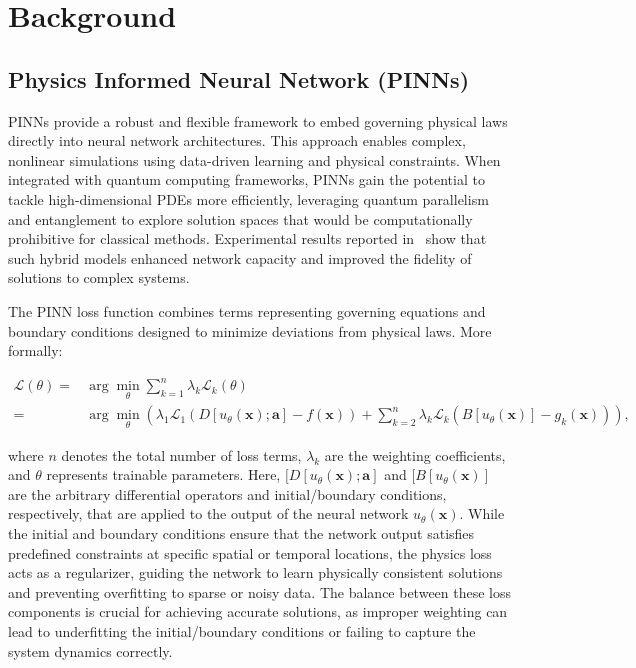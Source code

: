 \section{Background}
\label{sec:background}
\subsection{Physics Informed Neural Network (PINNs)}

PINNs \cite{raissi2019physics} provide a robust and flexible framework to embed governing physical laws directly into neural network architectures. This approach enables complex, nonlinear simulations using data-driven learning and physical constraints. When integrated with quantum computing frameworks, PINNs gain the potential to tackle high-dimensional PDEs more efficiently, leveraging quantum parallelism and entanglement to explore solution spaces that would be computationally prohibitive for classical methods. Experimental results reported in~\cite{kyriienko2021solving,markidis2022physics,VADYALA2023100287,sedykh2024hybrid,trahan2024quantum,ye2024hybrid} show that such hybrid models enhanced network capacity and improved the fidelity of solutions to complex systems.

The PINN loss function combines terms representing governing equations and boundary conditions designed to minimize deviations from physical laws. More formally:

\begin{equation} 
    \begin{split}
    \mathcal{L}(\theta) =& \arg\min_{\theta} \sum_{k=1}^{n} \lambda_k \mathcal{L}_k(\theta) \\
    =& \arg\min_{\theta} \left( \lambda_1 \mathcal{L}_1(D[u_{\theta}(\mathbf{x}); \mathbf{a}] - f(\mathbf{x}))
    +\sum_{k=2}^{n} \lambda_k \mathcal{L}_k(B[u_{\theta}(\mathbf{x})] - g_k(\mathbf{x})) \right),
    \end{split}
 \end{equation}

\noindent where $n$ denotes the total number of loss terms, $\lambda_k$   are the weighting coefficients, and $\theta$ represents trainable parameters. Here, $[D[u_{\theta}(\mathbf{x});\mathbf{a}]$ and $[B[u_{\theta}(\mathbf{x})]$ are the arbitrary differential operators and initial/boundary conditions, respectively, that are applied to the output of the neural network $u_{\theta}(\mathbf{x})$. While the initial and boundary conditions ensure that the network output satisfies predefined constraints at specific spatial or temporal locations,  the physics loss acts as a regularizer, guiding the network to learn physically consistent solutions and preventing overfitting to sparse or noisy data. The balance between these loss components is crucial for achieving accurate solutions, as improper weighting can lead to underfitting the initial/boundary conditions or failing to capture the system dynamics correctly.



